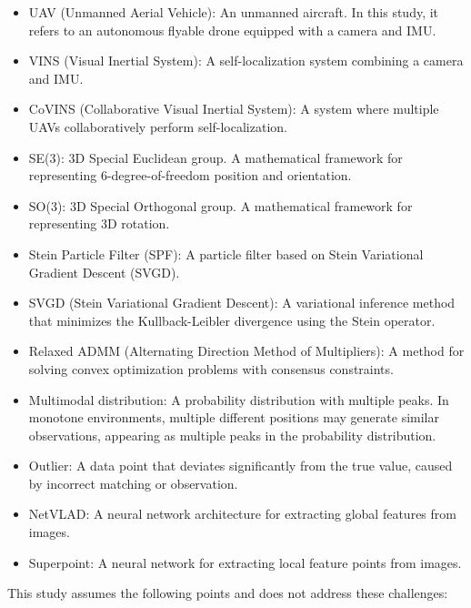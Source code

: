 \documentclass[a4paper,fleqn,10pt,twocolumn]{SICE_ISCS}
\begin{document}
\begin{itemize}
\item UAV (Unmanned Aerial Vehicle): An unmanned aircraft. In this study, it refers to an autonomous flyable drone equipped with a camera and IMU.
\item VINS (Visual Inertial System): A self-localization system combining a camera and IMU.
\item CoVINS (Collaborative Visual Inertial System): A system where multiple UAVs collaboratively perform self-localization.
\item SE(3): 3D Special Euclidean group. A mathematical framework for representing 6-degree-of-freedom position and orientation.
\item SO(3): 3D Special Orthogonal group. A mathematical framework for representing 3D rotation.
\item Stein Particle Filter (SPF): A particle filter based on Stein Variational Gradient Descent (SVGD).
\item SVGD (Stein Variational Gradient Descent): A variational inference method that minimizes the Kullback-Leibler divergence using the Stein operator.
\item Relaxed ADMM (Alternating Direction Method of Multipliers): A method for solving convex optimization problems with consensus constraints.
\item Multimodal distribution: A probability distribution with multiple peaks. In monotone environments, multiple different positions may generate similar observations, appearing as multiple peaks in the probability distribution.
\item Outlier: A data point that deviates significantly from the true value, caused by incorrect matching or observation.
\item NetVLAD: A neural network architecture for extracting global features from images.
\item Superpoint: A neural network for extracting local feature points from images.
\end{itemize}

This study assumes the following points and does not address these challenges:
\end{document}
